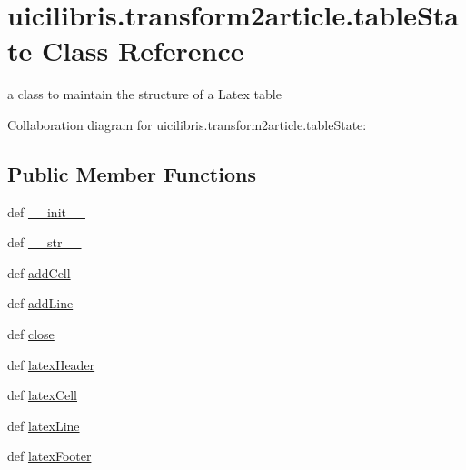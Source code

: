 \hypertarget{classuicilibris_1_1transform2article_1_1tableState}{\section{uicilibris.\-transform2article.\-table\-State \-Class \-Reference}
\label{classuicilibris_1_1transform2article_1_1tableState}
}


a class to maintain the structure of a \-Latex table  




\-Collaboration diagram for uicilibris.\-transform2article.\-table\-State\-:
\subsection*{\-Public \-Member \-Functions}
\begin{DoxyCompactItemize}
\item 
def \hyperlink{classuicilibris_1_1transform2article_1_1tableState_ae7f114d792ae98a8c301131136b4141a}{\-\_\-\-\_\-init\-\_\-\-\_\-}
\item 
def \hyperlink{classuicilibris_1_1transform2article_1_1tableState_a72e56ce18b2c488345489482916b98ff}{\-\_\-\-\_\-str\-\_\-\-\_\-}
\item 
def \hyperlink{classuicilibris_1_1transform2article_1_1tableState_aec6897f665d96b8c9d410269b35d8ece}{add\-Cell}
\item 
def \hyperlink{classuicilibris_1_1transform2article_1_1tableState_ac9dd1cdc92308ea7b88c55ff2535a059}{add\-Line}
\item 
def \hyperlink{classuicilibris_1_1transform2article_1_1tableState_ae2f280ceeebf7fd59fb31a929856fbe5}{close}
\item 
def \hyperlink{classuicilibris_1_1transform2article_1_1tableState_ad670ec501ced5639f70e0fbfc00d2853}{latex\-Header}
\item 
def \hyperlink{classuicilibris_1_1transform2article_1_1tableState_a6abbfe888873bc40fe24785cad3d270a}{latex\-Cell}
\item 
def \hyperlink{classuicilibris_1_1transform2article_1_1tableState_a1759d75531d377da045ef0b7076d4721}{latex\-Line}
\item 
def \hyperlink{classuicilibris_1_1transform2article_1_1tableState_acbf35223c34bf17980f22409da5d33e4}{latex\-Footer}
\end{DoxyCompactItemize}
